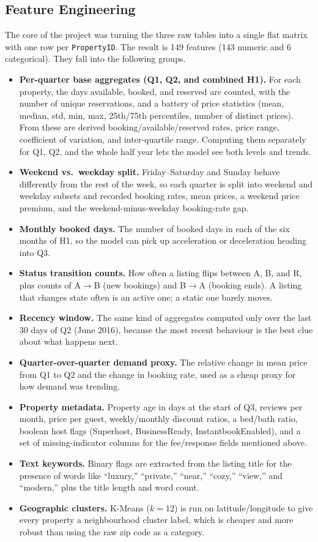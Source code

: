 \documentclass[journal]{IEEEtran}
\begin{document}
\subsection{Feature Engineering}
The core of the project was turning the three raw tables into a single flat
matrix with one row per \texttt{PropertyID}. The result is 149 features (143
numeric and 6 categorical). They fall into the following groups.
\begin{itemize}
\item \textbf{Per-quarter base aggregates (Q1, Q2, and combined H1).} For each
property, the days available, booked, and reserved are counted, with the number of
unique reservations, and a battery of price statistics (mean, median, std, min,
max, 25th/75th percentiles, number of distinct prices). From these are derived
booking/available/reserved rates, price range, coefficient of variation, and
inter-quartile range. Computing them separately for Q1, Q2, and the whole half
year lets the model see both levels and trends.
\item \textbf{Weekend vs.\ weekday split.} Friday--Saturday and Sunday behave
differently from the rest of the week, so each quarter is split into weekend and
weekday subsets and recorded booking rates, mean prices, a weekend price
premium, and the weekend-minus-weekday booking-rate gap.
\item \textbf{Monthly booked days.} The number of booked days in each of the six
months of H1, so the model can pick up acceleration or deceleration heading into
Q3.
\item \textbf{Status transition counts.} How often a listing flips between A, B,
and R, plus counts of A$\to$B (new bookings) and B$\to$A (booking ends). A
listing that changes state often is an active one; a static one barely moves.
\item \textbf{Recency window.} The same kind of aggregates computed only over
the last 30 days of Q2 (June 2016), because the most recent behaviour is the
best clue about what happens next.
\item \textbf{Quarter-over-quarter demand proxy.} The relative change in mean
price from Q1 to Q2 and the change in booking rate, used as a cheap proxy for how
demand was trending.
\item \textbf{Property metadata.} Property age in days at the start of Q3,
reviews per month, price per guest, weekly/monthly discount ratios, a bed/bath
ratio, boolean host flags (Superhost, BusinessReady, InstantbookEnabled), and a
set of missing-indicator columns for the fee/response fields mentioned above.
\item \textbf{Text keywords.} Binary flags are extracted from the listing
title for the presence of words like ``luxury,'' ``private,'' ``near,''
``cozy,'' ``view,'' and ``modern,'' plus the title length and word count.
\item \textbf{Geographic clusters.} K-Means ($k=12$) is run on
latitude/longitude to give every property a neighbourhood cluster label, which
is cheaper and more robust than using the raw zip code as a category.
\end{itemize}
\end{document}
